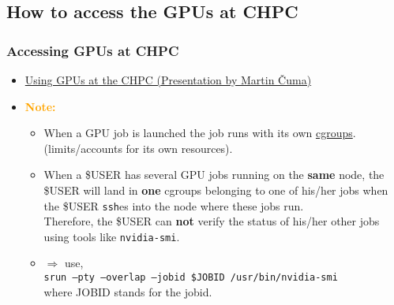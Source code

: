 \subsection{How to access the GPUs at CHPC}
\begin{frame}
   \frametitle{Accessing GPUs at CHPC}
      \begin{itemize}
	 \item \href{https://www.chpc.utah.edu/presentations/images-and-pdfs/usinggpuss24f.pdf}{Using GPUs at the CHPC (Presentation by Martin \v{C}uma)}
	 \item \textbf{\textcolor{orange}{Note:}}
            \begin{itemize}
		    \item When a GPU job is launched the job runs with its own \href{https://en.wikipedia.org/wiki/Cgroups}{cgroups}.
		     (limits/accounts for its own resources).
	     \item When a \$USER has several GPU jobs running on the \textbf{same} node,
	 	   the \$USER will land in \textbf{one} cgroups belonging to one of his/her jobs
                   when the \$USER \texttt{ssh}es into the node where these jobs run.\\
	  	   Therefore, the \$USER can \textbf{not} verify the status of his/her other jobs 
                   using tools like \texttt{nvidia-smi}.
	       \item $\Rightarrow$ use, \\\texttt{srun --pty --overlap --jobid \$JOBID /usr/bin/nvidia-smi} \\
		     where JOBID stands for the jobid.   
            \end{itemize}			    
      \end{itemize}		      
\end{frame}	

